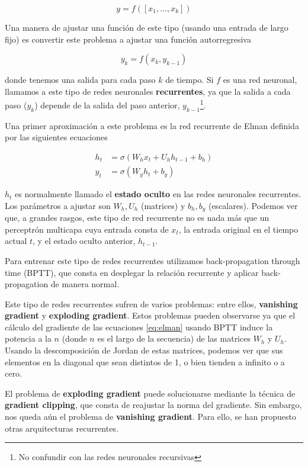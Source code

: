 \begin{equation*}
    y = f([x_1, \ldots, x_k])
\end{equation*}

Una manera de ajustar una función de este tipo (usando una entrada de largo fijo) es convertir este problema a ajustar una función autorregresiva

\begin{equation*}
    y_k = f(x_k, y_{k-1})
\end{equation*}

donde tenemos una salida para cada paso $k$ de tiempo. Si $f$ es una red neuronal, llamamos a este tipo de redes neuronales \textbf{recurrentes}, ya que la salida a cada paso ($y_k$) depende de la salida del paso anterior, $y_{k-1}$\footnote{No confundir con las redes neuronales recursivas}.

Una primer aproximación a este problema es la red recurrente de Elman \cite{elman1990finding} definida por las siguientes ecuaciones

\begin{align}
h_t &= \sigma(W_h x_t + U_h h_{t-1} + b_h) \\
y_t &= \sigma(W_y h_t + b_y)
\label{eq:elman}
\end{align}

$h_t$ es normalmente llamado el \textbf{estado oculto} en las redes neuronales recurrentes. Los parámetros a ajustar son $W_h, U_h$ (matrices) y $b_h, b_y$ (escalares). Podemos ver que, a grandes rasgos, este tipo de red recurrente no es nada más que un perceptrón multicapa cuya entrada consta de $x_t$, la entrada original en el tiempo actual $t$, y el estado oculto anterior, $h_{t-1}$.

Para entrenar este tipo de redes recurrentes utilizamos back-propagation through time (BPTT), que consta en desplegar la relación recurrente y aplicar back-propagation de manera normal. 

Este tipo de redes recurrentes sufren de varios problemas: entre ellos, \textbf{vanishing gradient} y \textbf{exploding gradient}. Estos problemas pueden observarse ya que el cálculo del gradiente de las ecuaciones \ref{eq:elman} usando BPTT induce la potencia a la $n$ (donde $n$ es el largo de la secuencia) de las matrices $W_h$ y $U_h$. Usando la descomposición de Jordan de estas matrices, podemos ver que sus elementos en la diagonal que sean distintos de 1, o bien tienden a infinito o a cero.

El problema de \textbf{exploding gradient} puede solucionarse mediante la técnica de \textbf{gradient clipping}, que consta de reajustar la norma del gradiente. Sin embargo, nos queda aún el problema de \textbf{vanishing gradient}. Para ello, se han propuesto otras arquitecturas recurrentes.

